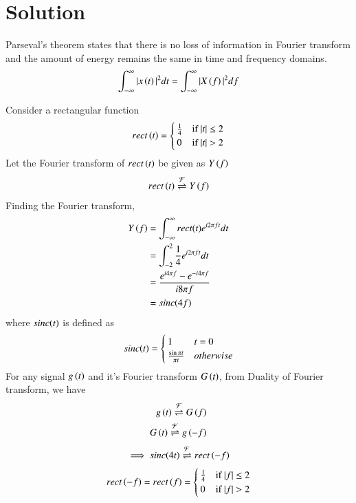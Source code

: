 \documentclass[journal,12pt,twocolumn]{IEEEtran}
\begin{document}
\section{Solution}
\begin{lemma}
Parseval's theorem states that there is no loss of information in Fourier transform and the amount of energy remains the same in time and frequency domains.
\begin{align}
    \int_{-\infty}^{\infty} |x\left(t\right)|^{2} dt = \int_{-\infty}^{\infty} |X\left(f\right)|^{2} df
\end{align}
\end{lemma}
Consider a rectangular function
\begin{align}
rect\left(t\right) =
    \begin{cases}
    \frac{1}{4} & \text{if } |t| \leq 2\\
    0 & \text{if } |t| > 2
    \end{cases}
\end{align}
Let the Fourier transform of $rect\left(t\right)$ be given as $Y\left(f\right)$
\begin{align}
    rect\left(t\right) \overset{\mathcal{F}}{ \rightleftharpoons}{Y} \left(f\right)
\end{align}
Finding the Fourier transform,
\begin{align}
    Y\left(f\right) &= \int_{-\infty}^{\infty} rect(t)e^{i2\pi ft}dt\\
    &= \int_{-2}^{2}\frac{1}{4}e^{i2\pi ft}dt\\
    &= \frac{e^{i4\pi f} - e^{-i4\pi f}}{i8\pi f}\\
    &= sinc{\left(4f\right)}
\end{align}
where $sinc{\left(t\right)}$ is defined as
\begin{align}
sinc{\left(t\right)} =
    \begin{cases}
    1 & t = 0\\
    \frac{\sin{\pi t}}{\pi t} & otherwise
    \end{cases}
\end{align}
For any signal $g\left(t\right)$ and it's Fourier transform $G\left(t\right)$, from Duality of Fourier transform, we have
\begin{align}
    g\left(t\right) \overset{\mathcal{F}}{ \rightleftharpoons}{G} \left(f\right)\\
    G\left(t\right) \overset{\mathcal{F}}{ \rightleftharpoons}{g} \left(-f\right)
\end{align}
\begin{align}
    \implies sinc{\left(4t\right)} \overset{\mathcal{F}}{ \rightleftharpoons} rect\left(-f\right) 
\end{align}
\begin{align}
    rect\left(-f\right) = rect\left(f\right) = 
    \begin{cases}
    \frac{1}{4} & \text{if } |f| \leq 2\\
    0 & \text{if } |f| > 2
    \end{cases}
\end{align}
\end{document}
